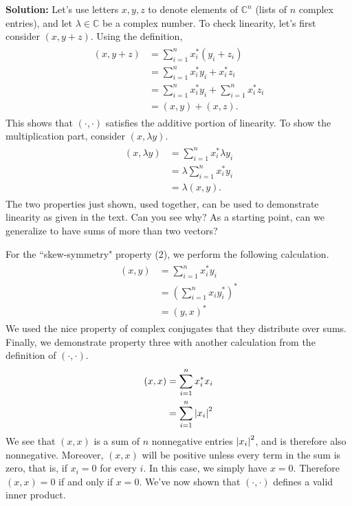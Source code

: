 \documentclass{book}
\begin{document}
    \textbf{Solution:} Let's use letters $x, y, z$ to denote elements of $\mathbb{C}^n$ (lists of $n$ complex entries), and let $\lambda \in \mathbb{C}$ be a complex number. To check linearity, let's first consider $(x, y+z)$. Using the definition,
    \begin{align}
    \begin{aligned}
        (x, y+z) &= \sum_{i=1}^n x_i^* (y_i + z_i) \\
        &= \sum_{i=1}^n x_i^* y_i + x_i^* z_i \\
        &= \sum_{i=1}^n x_i^* y_i + \sum_{i=1}^n x_i^* z_i \\
        &= (x, y) + (x,z).
    \end{aligned}
    \end{align}
    This shows that $(\cdot, \cdot)$ satisfies the additive portion of linearity. To show the multiplication part, consider $(x, \lambda y)$.
    \begin{align}
    \begin{aligned}
        (x, \lambda y) &= \sum_{i=1}^n x_i^* \lambda y_i \\
        &= \lambda \sum_{i=1}^n x_i^* y_i \\
        &= \lambda (x,y).
    \end{aligned}
    \end{align}
    The two properties just shown, used together, can be used to demonstrate linearity as given in the text. Can you see why? As a starting point, can we generalize to have sums of more than two vectors?
    
    For the ``skew-symmetry" property (2), we perform the following calculation.
    \begin{align}
    \begin{aligned}
        (x, y) &= \sum_{i=1}^n x_i^* y_i \\
        &= \left(\sum_{i=1}^n x_i y_i^*\right)^* \\
        &= (y, x)^*
    \end{aligned}
    \end{align}
    We used the nice property of complex conjugates that they distribute over sums. Finally, we demonstrate property three with another calculation from the definition of $(\cdot, \cdot)$.
    \begin{align}
    \begin{aligned}
        (x, x) &= \sum_{i=1}^n x_i^* x_i \\
        &= \sum_{i=1}^n \abs{x_i}^2
    \end{aligned}
    \end{align}
    We see that $(x,x)$ is a sum of $n$ nonnegative entries $\abs{x_i}^2$, and is therefore also nonnegative. Moreover, $(x,x)$ will be positive unless every term in the sum is zero, that is, if $x_i = 0$ for every $i$. In this case, we simply have $x = 0$. Therefore $(x,x) = 0$ if and only if $x = 0$. We've now shown that $(\cdot, \cdot)$ defines a valid inner product.
    
\end{document}

